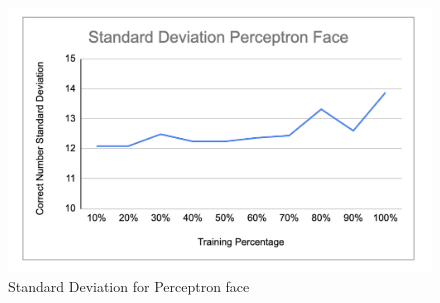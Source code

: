 \documentclass[11pt]{report}
\begin{document}
\begin{figure}[h]
\begin{center}
\includegraphics[scale=0.5]{Perceptron_face_SD.png} 
\end{center}
\caption{Standard Deviation for Perceptron face}
\end{figure}
\end{document}
